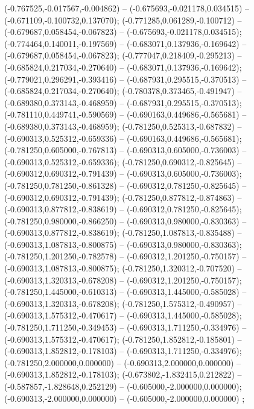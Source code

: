  (-0.767525,-0.017567,-0.004862) -- (-0.675693,-0.021178,0.034515) -- (-0.671109,-0.100732,0.137070);
 (-0.771285,0.061289,-0.100712) -- (-0.679687,0.058454,-0.067823) -- (-0.675693,-0.021178,0.034515);
 (-0.774464,0.140011,-0.197569) -- (-0.683071,0.137936,-0.169642) -- (-0.679687,0.058454,-0.067823);
 (-0.777047,0.218409,-0.295213) -- (-0.685824,0.217034,-0.270640) -- (-0.683071,0.137936,-0.169642);
 (-0.779021,0.296291,-0.393416) -- (-0.687931,0.295515,-0.370513) -- (-0.685824,0.217034,-0.270640);
 (-0.780378,0.373465,-0.491947) -- (-0.689380,0.373143,-0.468959) -- (-0.687931,0.295515,-0.370513);
 (-0.781110,0.449741,-0.590569) -- (-0.690163,0.449686,-0.565681) -- (-0.689380,0.373143,-0.468959);
 (-0.781250,0.525313,-0.687832) -- (-0.690313,0.525312,-0.659336) -- (-0.690163,0.449686,-0.565681);
 (-0.781250,0.605000,-0.767813) -- (-0.690313,0.605000,-0.736003) -- (-0.690313,0.525312,-0.659336);
 (-0.781250,0.690312,-0.825645) -- (-0.690312,0.690312,-0.791439) -- (-0.690313,0.605000,-0.736003);
 (-0.781250,0.781250,-0.861328) -- (-0.690312,0.781250,-0.825645) -- (-0.690312,0.690312,-0.791439);
 (-0.781250,0.877812,-0.874863) -- (-0.690313,0.877812,-0.838619) -- (-0.690312,0.781250,-0.825645);
 (-0.781250,0.980000,-0.866250) -- (-0.690313,0.980000,-0.830363) -- (-0.690313,0.877812,-0.838619);
 (-0.781250,1.087813,-0.835488) -- (-0.690313,1.087813,-0.800875) -- (-0.690313,0.980000,-0.830363);
 (-0.781250,1.201250,-0.782578) -- (-0.690312,1.201250,-0.750157) -- (-0.690313,1.087813,-0.800875);
 (-0.781250,1.320312,-0.707520) -- (-0.690313,1.320313,-0.678208) -- (-0.690312,1.201250,-0.750157);
 (-0.781250,1.445000,-0.610313) -- (-0.690313,1.445000,-0.585028) -- (-0.690313,1.320313,-0.678208);
 (-0.781250,1.575312,-0.490957) -- (-0.690313,1.575312,-0.470617) -- (-0.690313,1.445000,-0.585028);
 (-0.781250,1.711250,-0.349453) -- (-0.690313,1.711250,-0.334976) -- (-0.690313,1.575312,-0.470617);
 (-0.781250,1.852812,-0.185801) -- (-0.690313,1.852812,-0.178103) -- (-0.690313,1.711250,-0.334976);
 (-0.781250,2.000000,0.000000) -- (-0.690313,2.000000,0.000000) -- (-0.690313,1.852812,-0.178103);
 (-0.673802,-1.832415,0.212822) -- (-0.587857,-1.828648,0.252129) -- (-0.605000,-2.000000,0.000000);
 (-0.690313,-2.000000,0.000000) -- (-0.605000,-2.000000,0.000000) ;
